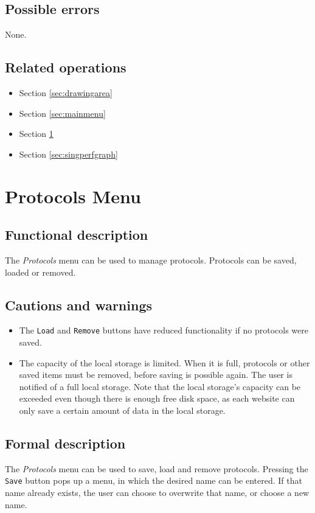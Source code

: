   \subsection*{Possible errors}
  None.

  \subsection*{Related operations}
  \begin{itemize}
    \item Section \ref{sec:drawingarea}
    \item Section \ref{sec:mainmenu}
    \item Section \ref{sec:protmenu}
    \item Section \ref{sec:singperfgraph}
  \end{itemize}

\section{Protocols Menu}\label{sec:protmenu}
  \subsection*{Functional description}
  The \emph{Protocols} menu can be used to manage protocols. Protocols can be saved, loaded or removed.

  \subsection*{Cautions and warnings}
  \begin{itemize}
    \item The \texttt{Load} and \texttt{Remove} buttons have reduced functionality if no protocols were saved.
    \item The capacity of the local storage is limited. When it is full, protocols or other saved \projectname{} items must be removed, before saving is possible again. The user is notified of a full local storage. Note that the local storage's capacity can be exceeded even though there is enough free disk space, as each website can only save a certain amount of data in the local storage.
  \end{itemize}  

  \subsection*{Formal description}
  The \emph{Protocols} menu can be used to save, load and remove protocols. Pressing the \texttt{Save} button pops up a menu, in which the desired name can be entered. If that name already exists, the user can choose to overwrite that name, or choose a new name.
  
